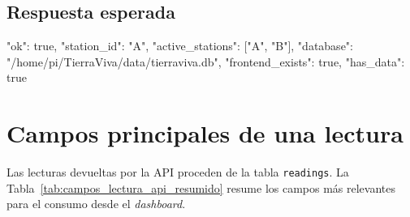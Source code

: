 \subsection*{Respuesta esperada}

\begin{jsoncode}
{
  "ok": true,
  "station_id": "A",
  "active_stations": ["A", "B"],
  "database": "/home/pi/TierraViva/data/tierraviva.db",
  "frontend_exists": true,
  "has_data": true
}
\end{jsoncode}

\section{Campos principales de una lectura}

Las lecturas devueltas por la API proceden de la tabla \texttt{readings}. La Tabla~\ref{tab:campos_lectura_api_resumido} resume los campos más relevantes para el consumo desde el \textit{dashboard}.

